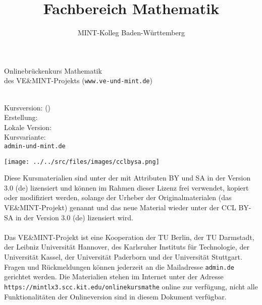 

\title{Fachbereich Mathematik}
\author{MINT-Kolleg Baden-W\"urttemberg}



\MSetSubject{\MINTMathematics}

\begin{framed}
\begin{center}
\LARGE
Onlinebrückenkurs Mathematik\\
\large
des VE\&MINT-Projekts (\texttt{www.ve-und-mint.de})
\end{center}
\ \\
Kursversion: \MSignatureMain (\MSignatureVersion) \\
Erstellung: \MSignatureDate \\
Lokale Version: \MSignatureLocalization \\ 
Kursvariante: \MSignatureVariant \\
\scriptsize \texttt{admin\@@ve-und-mint.de}
\end{framed}

\begin{center}
\texttt{[image: ../../src/files/images/cclbysa.png]}
\end{center}
Diese Kursmaterialien sind unter der 
mit Attributen BY und SA in der Version 3.0 (de) lizensiert und können im Rahmen dieser
Lizenz frei verwendet, kopiert oder modifiziert werden, solange der Urheber der Originalmaterialen (das VE\&MINT-Projekt) genannt
und das neue Material wieder unter der CCL BY-SA in der Version 3.0 (de) lizensiert wird.
\ \\ \ \\
Das VE\&MINT-Projekt ist eine Kooperation der TU Berlin, der TU Darmstadt, der Leibniz Universität Hannover, des Karlsruher
Instituts für Technologie, der Universität Kassel, der Universität Paderborn und der Universität Stuttgart.
Fragen und Rückmeldungen können jederzeit an die Mailadresse \texttt{admin\@@veundmint.de} gerichtet werden.
Die Materialien stehen im Internet unter der Adresse \texttt{https://mintlx3.scc.kit.edu/onlinekursmathe}
online zur verfügung, nicht alle Funktionalitäten der Onlineversion sind in diesem Dokument verfügbar.




\tableofcontents



\MPrintIndex


